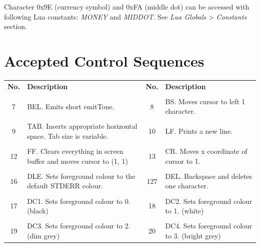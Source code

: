Character 0x9E (currency symbol) and 0xFA (middle dot) can be accessed with following Lua constants: \emph{MONEY} and \emph{MIDDOT}. See \emph{Lua Globals} > \emph{Constants} section.

\section{Accepted Control Sequences}

\begin{tabularx}{\textwidth}{c X c X}
	\textbf{\large No.} & \textbf{\large Description} & \textbf{\large No.} & \textbf{\large Description}
	\\ \\
	\endhead
	7 & BEL. Emits short emitTone. & 8 & BS. Moves cursor to left 1 character.
	\\ \\
	9 & TAB. Inserts appropriate horizontal space. Tab size is variable. & 10 & LF. Prints a new line.
	\\ \\
	12 & FF. Clears everything in screen buffer and moves cursor to (1, 1) & 13 & CR. Moves x coordinate of cursor to 1.
	\\ \\
	16 & DLE. Sets foreground colour to the default STDERR colour. & 127 & DEL. Backspace and deletes one character.
	\\ \\
	17 & DC1. Sets foreground colour to 0. (black) & 18 & DC2. Sets foreground colour to 1. (white)
	\\ \\
	19 & DC3. Sets foreground colour to 2. (dim grey) & 20 & DC4. Sets foreground colour to 3. (bright grey)
\end{tabularx}